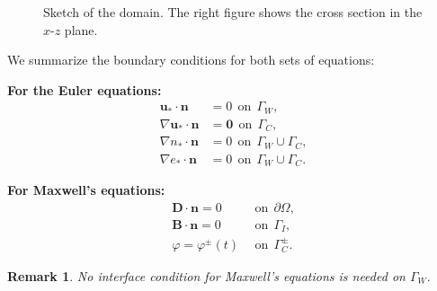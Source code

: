 \documentclass{article}
\newtheorem*{remark}{Remark}
\begin{document}
\begin{figure}
\begin{minipage}{0.49\textwidth}
{}
\end{minipage}
\caption{Sketch of the domain. The right figure shows the cross section in the $x$-$z$ plane.}
\label{fig:domain_sketch}
\end{figure}


    We summarize the boundary conditions for both sets of equations:
    
\vspace{10pt}
\begin{minipage}[t]{0.49\textwidth}
    \textbf{For the Euler equations:}
    \begin{align*}
    \mathbf{u_*}\cdot \mathbf{n} &= 0 \ \ \text{on} \ \ \Gamma_W, \\
    \nabla \mathbf{u_*} \cdot \mathbf{n} &= \mathbf{0} \ \ \text{on} \ \ \Gamma_C, \\
    \nabla n_* \cdot \mathbf{n} &= 0 \ \ \text{on} \ \ \Gamma_W \cup \Gamma_C, \\
    \nabla e_* \cdot \mathbf{n} &= 0 \ \ \text{on} \ \ \Gamma_W \cup \Gamma_C.
\end{align*}
\end{minipage}
\begin{minipage}[t]{0.49\textwidth}
    \textbf{For Maxwell's equations:}
    \begin{align*}
    \mathbf{D} \cdot \mathbf{n} = 0\ \ &\text{on} \ \  \partial\Omega,  \\
    \mathbf{B} \cdot \mathbf{n} = 0\ \ &\text{on} \ \  \Gamma_I,  \\
    \varphi = \varphi^\pm(t)\ \ &\text{on} \ \ \Gamma_C^\pm.
    \end{align*}
\end{minipage}

\vspace{10pt}
\begin{remark}
    No interface condition for Maxwell's equations is needed on $\Gamma_W$.
\end{remark}
\end{document}
